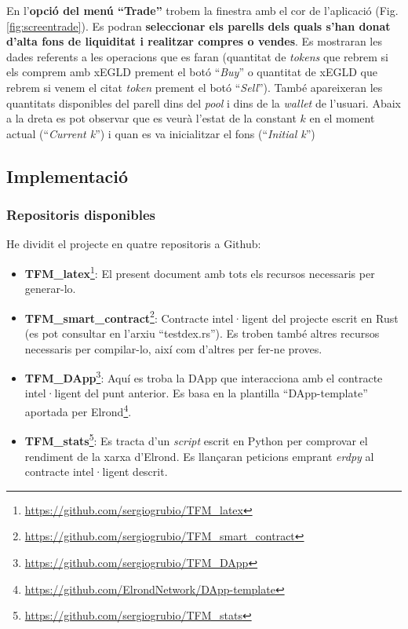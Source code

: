 \documentclass[11pt,a4paper]{article}
\begin{document}
En l'\textbf{opció del menú ``Trade''} trobem la finestra amb el cor de l'aplicació (Fig. \ref{fig:screentrade}). Es podran \textbf{seleccionar els parells dels quals s'han donat d'alta fons de liquiditat i realitzar compres o vendes}. Es mostraran les dades referents a les operacions que es faran (quantitat de \textit{tokens} que rebrem si els comprem amb xEGLD prement el botó ``\textit{Buy}'' o quantitat de xEGLD que rebrem si venem el citat \textit{token} prement el botó ``\textit{Sell}''). També apareixeran les quantitats disponibles del parell dins del \textit{pool} i dins de la \textit{wallet} de l'usuari. Abaix a la dreta es pot observar que es veurà l'estat de la constant \(k\) en el moment actual (``\textit{Current k}'') i quan es va inicialitzar el fons (``\textit{Initial k}'')

\subsection{Implementació}\label{sec:imp}
\subsubsection{Repositoris disponibles}
He dividit el projecte en quatre repositoris a Github:
\begin{itemize}
\item \textbf{TFM\_latex}\footnote{\url{https://github.com/sergiogrubio/TFM_latex}}: El present document amb tots els recursos necessaris per generar-lo.
\item \textbf{TFM\_smart\_contract}\footnote{\url{https://github.com/sergiogrubio/TFM_smart_contract}}: Contracte intel·ligent del projecte escrit en Rust (es pot consultar en l'arxiu ``testdex.rs''). Es troben també altres recursos necessaris per compilar-lo, així com d'altres per fer-ne proves.
\item \textbf{TFM\_DApp}\footnote{\url{https://github.com/sergiogrubio/TFM_DApp}}: Aquí es troba la DApp que interacciona amb el contracte intel·ligent del punt anterior. Es basa en la plantilla ``DApp-template'' aportada per Elrond\footnote{\url{https://github.com/ElrondNetwork/DApp-template}}.
\item \textbf{TFM\_stats}\footnote{\url{https://github.com/sergiogrubio/TFM_stats}}: Es tracta d'un \textit{script} escrit en Python per comprovar el rendiment de la xarxa d'Elrond. Es llançaran peticions emprant \textit{erdpy} al contracte intel·ligent descrit.  
\end{itemize}
\end{document}
